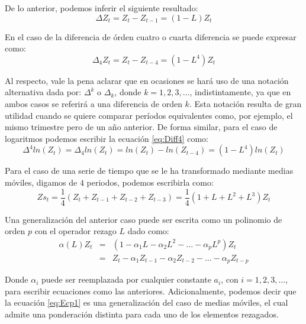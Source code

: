 \documentclass[
]{book}
\begin{document}
De lo anterior, podemos inferir el siguiente resultado:
\begin{equation}
    \Delta Z_{t} = Z_{t} - Z_{t-1} = (1 - L) Z_{t} 
    \label{eq:Lag5}
\end{equation}

En el caso de la diferencia de órden cuatro o cuarta diferencia se puede expresar como:
\begin{equation}
    \Delta_{4} Z_{t} = Z_{t} - Z_{t-4} = (1 - L^4) Z_{t}
\label{eq:Diff4}
\end{equation}

Al respecto, vale la pena aclarar que en ocasiones se hará uso de una notación alternativa dada por: \(\Delta^k\) o \(\Delta_k\), donde \(k = 1, 2, 3, \ldots\), indistintamente, ya que en ambos casos se referirá a una diferencia de orden \(k\). Esta notación resulta de gran utilidad cuando se quiere comparar períodos equivalentes como, por ejemplo, el mismo trimestre pero de un año anterior. De forma similar, para el caso de logaritmos podemos escribir la ecuación \eqref{eq:Diff4} como:
\begin{equation}
    \Delta^{4} ln(Z_{t}) = \Delta_{4} ln(Z_{t}) = ln(Z_{t}) - ln(Z_{t-4}) = (1 - L^4) ln(Z_{t}) 
    \label{eq:Diff5}
\end{equation}

Para el caso de una serie de tiempo que se le ha transformado mediante medias móviles, digamos de \(4\) periodos, podemos escribirla como:
\begin{equation}
    Zs_{t} = \frac{1}{4}(Z_{t} + Z_{t-1} + Z_{t-2} + Z_{t-3}) = \frac{1}{4}(1 + L + L^2 + L^3)Z_{t}
    \label{eq:Diff6}
\end{equation}

Una generalización del anterior caso puede ser escrita como un polinomio de orden \(p\) con el operador rezago \(L\) dado como:
\begin{eqnarray}
    \alpha(L) Z_{t} & = & (1 - \alpha_1 L - \alpha_2 L^2 - \ldots - \alpha_p L^p) Z_{t} \nonumber \\
    & = & Z_{t} - \alpha_1 Z_{t-1} - \alpha_2 Z_{t-2} - \ldots - \alpha_p Z_{t-p}
\label{eq:Ecp1}
\end{eqnarray}

Donde \(\alpha_i\) puede ser reemplazada por cualquier constante \(a_i\), con \(i = 1, 2, 3, \ldots\), para escribir ecuaciones como las anteriores. Adicionalmente, podemos decir que la ecuación \eqref{eq:Ecp1} es una generalización del caso de medias móviles, el cual admite una ponderación distinta para cada uno de los elementos rezagados.
\end{document}
